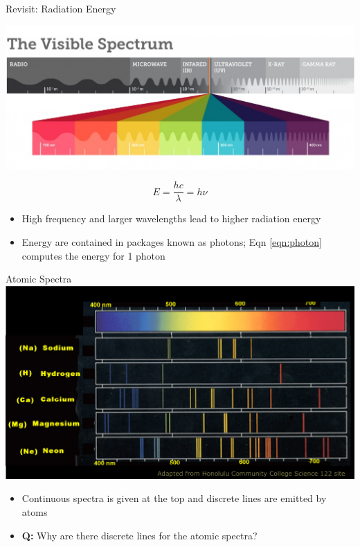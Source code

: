 \documentclass[11pt]{beamer}
\begin{document}
\begin{frame}{Revisit: Radiation Energy}
  \begin{center}
    \includegraphics[width=0.85\linewidth]{visible_light}
  \end{center}
  \begin{equation}
    E = \frac{hc}{\lambda} = h\nu
    \label{eqn:photon}
  \end{equation}
  \begin{itemize}
  \item High frequency and larger wavelengths lead to higher radiation
    energy
  \item Energy are contained in packages known as photons; Eqn \ref{eqn:photon}
    computes the energy for 1 photon
  \end{itemize}
\end{frame}

\begin{frame}{Atomic Spectra}
  \centering
  \includegraphics[width=0.85\linewidth]{cont_line}
  \begin{itemize}
  \item Continuous spectra is given at the top and
    discrete lines are emitted by atoms
  \item \textbf{Q:} Why are there discrete lines for
    the atomic spectra?
  \end{itemize}
\end{frame}
\end{document}
